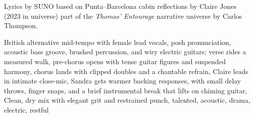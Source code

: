
\begin{notes}
Lyrics by SUNO based on Punta--Barcelona cabin reflections by Claire Jones (2023 in universe) %
part of the \emph{Thomas’ Entourage} narrative universe by Carlos Thompson.
\end{notes}
\begin{style}
British alternative mid-tempo with female lead vocals, posh pronunciation, acoustic bass groove, brushed percussion, and wiry electric guitars; verse rides a measured walk, pre-chorus opens with tense guitar figures and suspended harmony, chorus lands with clipped doubles and a chantable refrain, Claire leads in intimate close-mic, Sandra gets warmer backing responses, with small delay throws, finger snaps, and a brief instrumental break that lifts on chiming guitar, Clean, dry mix with elegant grit and restrained punch, talented, acoustic, drama, electric, restful
\end{style}
